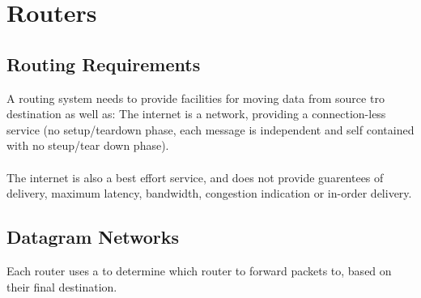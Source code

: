 \documentclass{report}
\begin{document}
\section*{Routers}
\subsection*{Routing Requirements}
A routing system needs to provide facilities for moving data from source tro destination as well as:
The internet is a  network, providing a connection-less service (no setup/teardown phase, each message is independent and self contained with no steup/tear down phase).
\\
\\ The internet is also a best effort service, and does not provide guarentees of delivery, maximum latency, bandwidth, congestion indication or in-order delivery.
\subsection*{Datagram Networks}
Each router uses a  to determine which router to forward packets to, based on their final destination.
\end{document}
